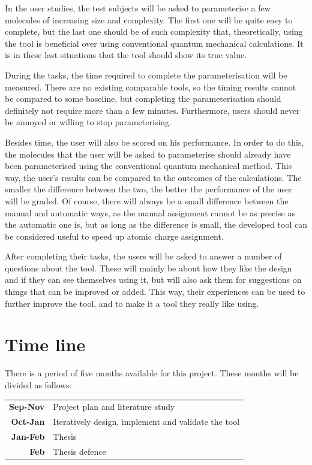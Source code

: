 In the user studies, the test subjects will be asked to parameterise a few molecules of increasing size and complexity. The first one will be quite easy to complete, but the last one should be of such complexity that, theoretically, using the tool is beneficial over using conventional quantum mechanical calculations. It is in these last situations that the tool should show its true value.

During the tasks, the time required to complete the parameterisation will be measured. There are no existing comparable tools, so the timing results cannot be compared to some baseline, but completing the parameterisation should definitely not require more than a few minutes. Furthermore, users should never be annoyed or willing to stop parameterising.

Besides time, the user will also be scored on his performance. In order to do this, the molecules that the user will be asked to parameterise should already have been parameterised using the conventional quantum mechanical method. This way, the user's results can be compared to the outcomes of the calculations. The smaller the difference between the two, the better the performance of the user will be graded. Of course, there will always be a small difference between the manual and automatic ways, as the manual assignment cannot be as precise as the automatic one is, but as long as the difference is small, the developed tool can be considered useful to speed up atomic charge assignment.

After completing their tasks, the users will be asked to answer a number of questions about the tool. These will mainly be about how they like the design and if they can see themselves using it, but will also ask them for suggestions on things that can be improved or added. This way, their experiences can be used to further improve the tool, and to make it a tool they really like using.


\section{Time line}

There is a period of five months available for this project. These months will be divided as follows:

\noindent
\begin{tabular}{r|l}
\textbf{Sep-Nov} & Project plan and literature study\\
\textbf{Oct-Jan} & Iteratively design, implement and validate the tool\\
\textbf{Jan-Feb} & Thesis\\
\textbf{Feb} & Thesis defence
\end{tabular}

